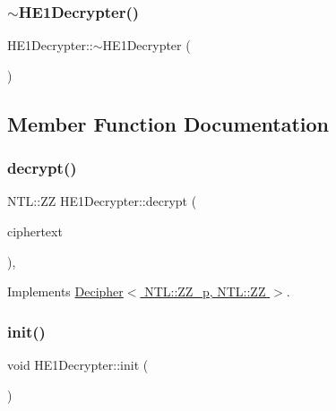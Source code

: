 \subsubsection{\texorpdfstring{$\sim$\+H\+E1\+Decrypter()}{~HE1Decrypter()}}
{\footnotesize\ttfamily H\+E1\+Decrypter\+::$\sim$\+H\+E1\+Decrypter (\begin{DoxyParamCaption}{ }\end{DoxyParamCaption})\hspace{0.3cm}{\ttfamily [virtual]}}



\subsection{Member Function Documentation}
\mbox{\label{classHE1Decrypter_a28cc03e8a37f321b8f805cc04b2e69e0}} 
\subsubsection{\texorpdfstring{decrypt()}{decrypt()}}
{\footnotesize\ttfamily N\+T\+L\+::\+ZZ H\+E1\+Decrypter\+::decrypt (\begin{DoxyParamCaption}\item[{N\+T\+L\+::\+Z\+Z\+\_\+p \&}]{ciphertext }\end{DoxyParamCaption})\hspace{0.3cm}{\ttfamily [override]}, {\ttfamily [virtual]}}



Implements \hyperlink{classDecipher_ac6b8c369eda2d7e17fa90cb594cf41b6}{Decipher$<$ N\+T\+L\+::\+Z\+Z\+\_\+p, N\+T\+L\+::\+Z\+Z $>$}.

\mbox{\label{classHE1Decrypter_ab10c6ecc422cbf5f492c7a039e2da97c}} 
\subsubsection{\texorpdfstring{init()}{init()}}
{\footnotesize\ttfamily void H\+E1\+Decrypter\+::init (\begin{DoxyParamCaption}{ }\end{DoxyParamCaption})}

\mbox{\label{classHE1Decrypter_af60ccc6d0afe7555a9d1468ad7047733}} 
